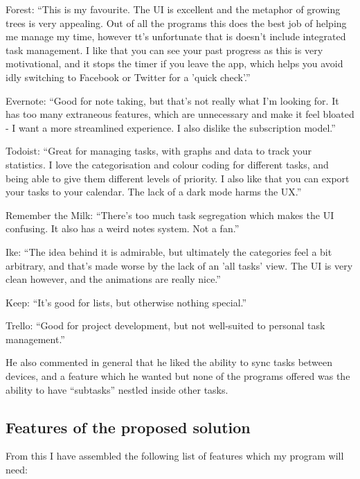 \documentclass{article}
\begin{document}
\begin{description}
	\item Forest: ``This is my favourite. The UI is excellent and the metaphor of
	      growing trees is very appealing. Out of all the programs this does the best
	      job of helping me manage my time, however tt's unfortunate that is doesn't
	      include integrated task management. I like that you can see your past progress
	      as this is very motivational, and it stops the timer if you leave the app,
	      which helps you avoid idly switching to Facebook or Twitter for a 'quick
	      check'.''
	\item Evernote: ``Good for note taking, but that's not really what I'm looking
	      for. It has too many extraneous features, which are unnecessary and make it
	      feel bloated - I want a more streamlined experience. I also dislike the
	      subscription model.''
	\item Todoist: ``Great for managing tasks, with graphs and data to track your
	      statistics. I love the categorisation and colour coding for different tasks,
	      and being able to give them different levels of priority. I also like that you
	      can export your tasks to your calendar. The lack of a dark mode harms the
	      UX.''
	\item Remember the Milk: ``There's too much task segregation which makes the UI
	      confusing. It also has a weird notes system. Not a fan.''
	\item Ike: ``The idea behind it is admirable, but ultimately the categories feel
	      a bit arbitrary, and that's made worse by the lack of an 'all tasks' view. The
	      UI is very clean however, and the animations are really nice.''
	\item Keep: ``It's good for lists, but otherwise nothing special.''
	\item Trello: ``Good for project development, but not well-suited to personal
	      task management.''
\end{description}

He also commented in general that he liked the ability to sync tasks between
devices, and a feature which he wanted but none of the programs offered was the
ability to have ``subtasks'' nestled inside other tasks.

\subsection{Features of the proposed solution}
From this I have assembled the following list of features which my program will
need:
\end{document}

